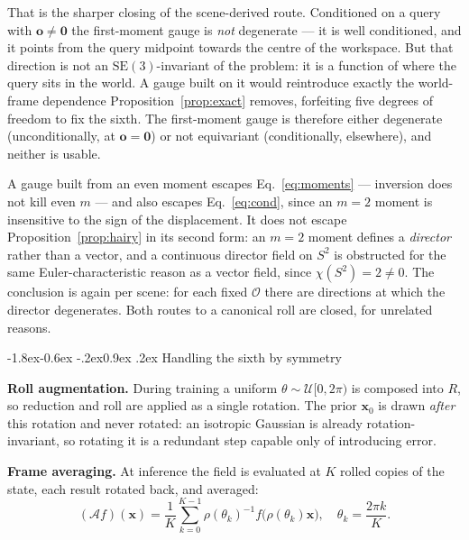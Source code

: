 \documentclass[10pt,twocolumn,letterpaper]{article}
\makeatletter
\renewcommand\subsection{\@startsection{subsection}{2}{\z@}%
  {-1.8ex\@plus -0.6ex \@minus -.2ex}{0.9ex \@plus .2ex}%
  {\normalfont\normalsize\bfseries}}
\theoremstyle{plain}
\newcommand{\SE}{\mathrm{SE}(3)}
\makeatother
\begin{document}
That is the sharper closing of the scene-derived route. Conditioned on a query
with $\mathbf{o}\neq\mathbf{0}$ the first-moment gauge is \emph{not}
degenerate --- it is well conditioned, and it points from the query midpoint
towards the centre of the workspace. But that direction is not an $\SE$-invariant
of the problem: it is a function of where the query sits in the world. A gauge
built on it would reintroduce exactly the world-frame dependence
Proposition~\ref{prop:exact} removes, forfeiting five degrees of freedom to fix
the sixth. The first-moment gauge is therefore either degenerate (unconditionally,
at $\mathbf{o}=\mathbf{0}$) or not equivariant (conditionally, elsewhere), and
neither is usable.

A gauge built from an even moment escapes Eq.~\eqref{eq:moments} --- inversion
does not kill even $m$ --- and also escapes Eq.~\eqref{eq:cond}, since an $m=2$
moment is insensitive to the sign of the displacement. It does not escape
Proposition~\ref{prop:hairy} in its second form: an $m=2$ moment defines a
\emph{director} rather than a vector, and a continuous director field on $S^2$ is
obstructed for the same Euler-characteristic reason as a vector field, since
$\chi(S^2)=2\neq0$. The conclusion is again per scene: for each fixed
$\mathcal{O}$ there are directions at which the director degenerates. Both routes
to a canonical roll are closed, for unrelated reasons.

\subsection{Handling the sixth by symmetry}
\label{sec:sixth}

\textbf{Roll augmentation.} During training a uniform $\theta\sim\mathcal{U}[0,2\pi)$
is composed into $R$, so reduction and roll are applied as a single rotation. The
prior $\mathbf{x}_0$ is drawn \emph{after} this rotation and never rotated: an
isotropic Gaussian is already rotation-invariant, so rotating it is a redundant
step capable only of introducing error.

\textbf{Frame averaging.} At inference the field is evaluated at $K$ rolled copies
of the state, each result rotated back, and averaged:
\begin{equation}
  (\mathcal{A}f)(\mathbf{x}) = \frac{1}{K}\sum_{k=0}^{K-1}
  \rho(\theta_k)^{-1} f\bigl(\rho(\theta_k)\mathbf{x}\bigr),
  \quad \theta_k=\frac{2\pi k}{K}.
  \label{eq:fa}
\end{equation}
\end{document}
